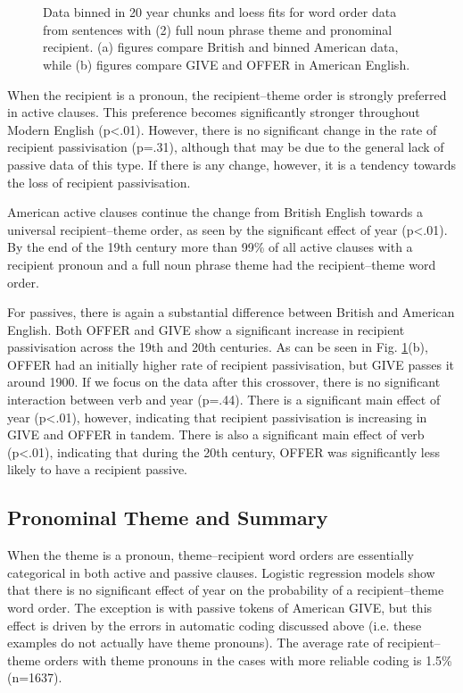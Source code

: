 \begin{figure}[p]
\\
\\
\label{Fig:wordordpro}
\caption{Data binned in 20 year chunks and loess fits for word order data from sentences with (2) full noun phrase theme and pronominal recipient. (a) figures compare British and binned American data, while (b) figures compare GIVE and OFFER in American English.}
\end{figure}

When the recipient is a pronoun, the recipient--theme order is strongly preferred in active clauses. This preference becomes significantly stronger throughout Modern English (p\textless .01). However, there is no significant change in the rate of recipient passivisation (p=.31), although that may be due to the general lack of passive data of this type. If there is any change, however, it is a tendency towards the loss of recipient passivisation.

American active clauses continue the change from British English towards a universal recipient--theme order, as seen by the significant effect of year (p\textless .01). By the end of the 19th century more than 99\% of all active clauses with a recipient pronoun and a full noun phrase theme had the recipient--theme word order.

For passives, there is again a substantial difference between British and American English. Both OFFER and GIVE show a significant increase in recipient passivisation across the 19th and 20th centuries. As can be seen in Fig. \ref{Fig:wordordpro}(b), OFFER had an initially higher rate of recipient passivisation, but GIVE passes it around 1900. If we focus on the data after this crossover, there is no significant interaction between verb and year (p=.44). There is a significant main effect of year (p\textless .01), however, indicating that recipient passivisation is increasing in GIVE and OFFER in tandem. There is also a significant main effect of verb (p\textless .01), indicating that during the 20th century, OFFER was significantly less likely to have a recipient passive. 

\subsection{Pronominal Theme and Summary}

When the theme is a pronoun, theme--recipient word orders are essentially categorical in both active and passive clauses. Logistic regression models show that there is no significant effect of year on the probability of a recipient--theme word order. The exception is with passive tokens of American GIVE, but this effect is driven by the errors in automatic coding discussed above (i.e. these examples do not actually have theme pronouns). The average rate of recipient--theme orders with theme pronouns in the cases with more reliable coding is 1.5\% (n=1637). 

